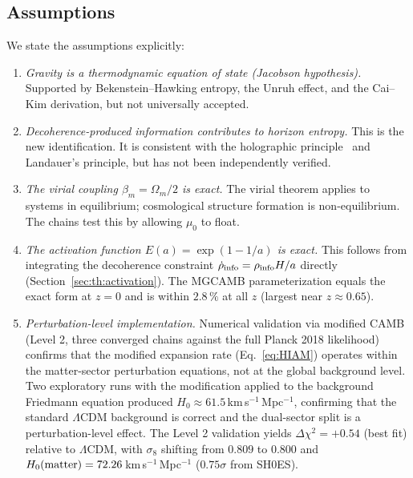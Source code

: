 \subsection{Assumptions}
We state the assumptions explicitly:
\begin{enumerate}
\item \emph{Gravity is a thermodynamic equation of state (Jacobson hypothesis).} Supported by Bekenstein--Hawking entropy, the Unruh effect, and the
Cai--Kim derivation, but not universally accepted.
\item \emph{Decoherence-produced information contributes to horizon entropy.} This is the new identification. It is consistent with the holographic
principle~\cite{tHooft1993,Susskind1995} and Landauer's principle, but has not been independently verified.
\item \emph{The virial coupling $\beta_m=\Omega_m/2$ is exact.} The virial theorem applies to systems in equilibrium; cosmological structure formation is
non-equilibrium. The chains test this by allowing $\mu_0$ to float.
\item \emph{The activation function $E(a)=\exp(1-1/a)$ is exact.} This follows from integrating the decoherence constraint
$\dot\rho_{\rm info}=\rho_{\rm info}H/a$ directly (Section~\ref{sec:th:activation}). The MGCAMB parameterization equals the exact form at $z=0$ and is within
$2.8\,\%$ at all $z$ (largest near $z\approx0.65$).
\item \emph{Perturbation-level implementation.} Numerical validation via modified CAMB (Level 2, three converged chains against the full Planck 2018
likelihood) confirms that the modified expansion rate (Eq.~\eqref{eq:HIAM}) operates within the matter-sector perturbation equations, not at the global
background level. Two exploratory runs with the modification applied to the background Friedmann equation produced $H_0\approx61.5$\,km\,s$^{-1}$\,Mpc$^{-1}$,
confirming that the standard $\Lambda$CDM background is correct and the dual-sector split is a perturbation-level effect. The Level 2 validation yields
$\Delta\chi^2=+0.54$ (best fit) relative to $\Lambda$CDM, with $\sigma_8$ shifting from $0.809$ to $0.800$ and $H_0({\rm matter})=72.26$\,km\,s$^{-1}$\,Mpc$^{-1}$
($0.75\sigma$ from SH0ES).
\end{enumerate}

